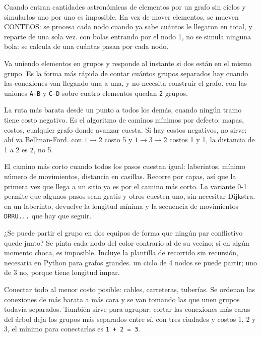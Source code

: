 Cuando entran cantidades astronómicas de elementos por un grafo sin ciclos y
simularlos uno por uno es imposible. En vez de mover elementos, se mueven CONTEOS:
se procesa cada nodo cuando ya sabe cuántos le llegaron en total, y reparte de una
sola vez.
\ej con  bolas entrando por el nodo 1, no se simula ninguna bola: se
calcula de una cuántas pasan por cada nodo.

Va uniendo elementos en grupos y responde al instante si dos están en el mismo
grupo. Es la forma más rápida de contar cuántos grupos separados hay cuando las
conexiones van llegando una a una, y no necesita construir el grafo.
\ej con las uniones \texttt{A-B} y \texttt{C-D} sobre cuatro elementos quedan
\texttt{2} grupos.

La ruta más barata desde un punto a todos los demás, cuando ningún tramo tiene
costo negativo. Es el algoritmo de caminos mínimos por defecto: mapas, costos,
cualquier grafo donde avanzar cuesta. Si hay costos negativos, no sirve: ahí va
Bellman-Ford.
\ej con $1\to2$ costo 5 y $1\to3\to2$ costos 1 y 1, la distancia de 1 a 2 es
\texttt{2}, no 5.

El camino más corto cuando todos los pasos cuestan igual: laberintos, mínimo número
de movimientos, distancia en casillas. Recorre por capas, así que la primera vez
que llega a un sitio ya es por el camino más corto. La variante 0-1 permite que
algunos pasos sean gratis y otros cuesten uno, sin necesitar Dijkstra.
\ej en un laberinto, devuelve la longitud mínima y la secuencia de movimientos
\texttt{DRRU...} que hay que seguir.

¿Se puede partir el grupo en dos equipos de forma que ningún par conflictivo quede
junto? Se pinta cada nodo del color contrario al de su vecino; si en algún momento
choca, es imposible. Incluye la plantilla de recorrido sin recursión, necesaria en
Python para grafos grandes.
\ej un ciclo de 4 nodos se puede partir; uno de 3 no, porque tiene longitud impar.

Conectar todo al menor costo posible: cables, carreteras, tuberías. Se ordenan las
conexiones de más barata a más cara y se van tomando las que unen grupos todavía
separados. También sirve para agrupar: cortar las conexiones más caras del árbol
deja los grupos más separados entre sí.
\ej con tres ciudades y costos 1, 2 y 3, el mínimo para conectarlas es
\texttt{1 + 2 = 3}.

